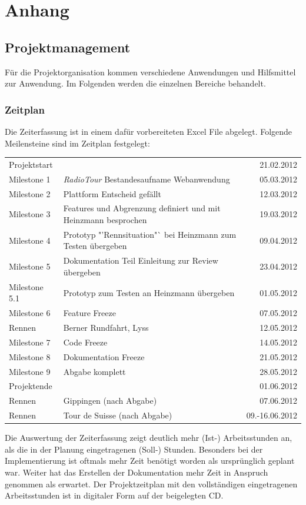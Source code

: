 \chapter{Anhang}

\section{Projektmanagement}
Für die Projektorganisation kommen verschiedene Anwendungen und Hilfsmittel zur Anwendung. Im Folgenden werden die einzelnen Bereiche behandelt.

\subsection{Zeitplan}
Die Zeiterfassung ist in einem dafür vorbereiteten Excel File abgelegt. Folgende Meilensteine sind im Zeitplan festgelegt:

\begin{tabular}{p{2.1cm}p{7.5cm}r}
Projektstart & & 21.02.2012\\
Milestone 1 & \textit{RadioTour} Bestandesaufname Webanwendung & 05.03.2012\\
Milestone 2 & Plattform Entscheid gefällt & 12.03.2012\\
Milestone 3 & Features und Abgrenzung definiert und mit Heinzmann besprochen & 19.03.2012\\
Milestone 4 & Prototyp "'Rennsituation"` bei Heinzmann zum Testen übergeben & 09.04.2012\\
Milestone 5 & Dokumentation Teil Einleitung zur Review übergeben & 23.04.2012\\
Milestone 5.1 & Prototyp zum Testen an Heinzmann übergeben & 01.05.2012\\
Milestone 6 & Feature Freeze & 07.05.2012\\
Rennen & Berner Rundfahrt, Lyss & 12.05.2012\\
Milestone 7 & Code Freeze & 14.05.2012\\
Milestone 8 & Dokumentation Freeze & 21.05.2012\\
Milestone 9 & Abgabe komplett & 28.05.2012\\
Projektende & & 01.06.2012\\
Rennen & Gippingen (nach Abgabe) & 07.06.2012\\
Rennen & Tour de Suisse (nach Abgabe) & 09.-16.06.2012\\
\end{tabular}

Die Auswertung der Zeiterfassung zeigt deutlich mehr (Ist-) Arbeitsstunden an, als die in der Planung eingetragenen (Soll-) Stunden. Besonders bei der Implementierung ist oftmals mehr Zeit benötigt worden als ursprünglich geplant war. Weiter hat das Erstellen der Dokumentation  mehr Zeit in Anspruch genommen als erwartet. Der Projektzeitplan mit den vollständigen eingetragenen Arbeitsstunden ist in digitaler Form auf der beigelegten CD.

